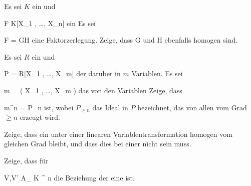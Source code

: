 {}
{





Es sei $K$ ein
und

\mavergleichskette
{\vergleichskette
{ F
}
{ \in }{ K[X_1 , \ldots ,  X_n]
}
{  }{
}
{    }{
}
{   }{
}
}
{}{}{}
ein
Es sei

\mavergleichskette
{\vergleichskette
{ F
}
{ = }{ GH
}
{  }{
}
{    }{
}
{   }{
}
}
{}{}{}
eine Faktorzerlegung. Zeige, dass
\mathkor {} {G} {und} {H} {}
ebenfalls homogen sind.





}
{} {}

{}
{





Es sei $R$ ein
und

\mavergleichskette
{\vergleichskette
{ P
}
{ = }{ R[X_1 , \ldots , X_m]
}
{  }{
}
{    }{
}
{   }{
}
}
{}{}{}
der
darüber in $m$ Variablen. Es sei

\mavergleichskette
{\vergleichskette
{ {\mathfrak m}
}
{ = }{ \left(  X_1 , \ldots , X_m  \right)
}
{  }{
}
{    }{
}
{   }{
}
}
{}{}{}
das von den Variablen
Zeige, dass

\mavergleichskette
{\vergleichskette
{ {\mathfrak m}^n
}
{ = }{ P_{\geq n}
}
{  }{
}
{    }{
}
{   }{
}
}
{}{}{}
ist, wobei $P_{\geq n}$ das Ideal in $P$ bezeichnet, das von allen
vom Grad $\geq n$ erzeugt wird.





}
{} {}

{}
{





Zeige, dass ein
unter einer linearen Variablentransformation homogen vom gleichen Grad bleibt, und dass dies bei einer
nicht sein muss.





}
{} {}

{}
{





Zeige, dass für

\mavergleichskette
{\vergleichskette
{ V,V'
}
{ \subseteq }{ { {\mathbb A}_{  K }^{  n   } }
}
{  }{
}
{    }{
}
{   }{
}
}
{}{}{}
die Beziehung der
eine
ist.





}
{} {}

